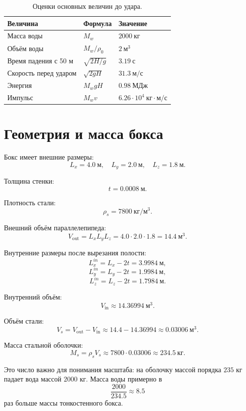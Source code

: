 \documentclass[12pt,a4paper]{article}
\begin{document}
\begin{table}[h]
\centering
\begin{tabular}{lll}
\toprule
Величина & Формула & Значение \\
\midrule
Масса воды & \(M_w\) & \(2000 \ \text{кг}\) \\
Объём воды & \(M_w/\rho_0\) & \(2 \ \text{м}^3\) \\
Время падения с 50 м & \(\sqrt{2H/g}\) & \(3.19 \ \text{с}\) \\
Скорость перед ударом & \(\sqrt{2gH}\) & \(31.3 \ \text{м}/\text{с}\) \\
Энергия & \(M_wgH\) & \(0.98 \ \text{МДж}\) \\
Импульс & \(M_wv\) & \(6.26\cdot 10^4 \ \text{кг}\cdot\text{м}/\text{с}\) \\
\bottomrule
\end{tabular}
\caption{Оценки основных величин до удара.}
\end{table}

\section{Геометрия и масса бокса}

Бокс имеет внешние размеры:
\[
L_x = 4.0 \ \text{м}, \quad
L_y = 2.0 \ \text{м}, \quad
L_z = 1.8 \ \text{м}.
\]

Толщина стенки:
\[
t = 0.0008 \ \text{м}.
\]

Плотность стали:
\[
\rho_s = 7800 \ \text{кг}/\text{м}^3.
\]

Внешний объём параллелепипеда:
\[
V_{\text{out}} = L_xL_yL_z
= 4.0 \cdot 2.0 \cdot 1.8
= 14.4 \ \text{м}^3.
\]

Внутренние размеры после вырезания полости:
\[
L_x^{in}=L_x-2t=3.9984 \ \text{м},
\]
\[
L_y^{in}=L_y-2t=1.9984 \ \text{м},
\]
\[
L_z^{in}=L_z-2t=1.7984 \ \text{м}.
\]

Внутренний объём:
\[
V_{\text{in}} \approx 14.36994 \ \text{м}^3.
\]

Объём стали:
\[
V_s = V_{\text{out}} - V_{\text{in}}
\approx 14.4 - 14.36994
\approx 0.03006 \ \text{м}^3.
\]

Масса стальной оболочки:
\[
M_s = \rho_s V_s
\approx 7800 \cdot 0.03006
\approx 234.5 \ \text{кг}.
\]

Это число важно для понимания масштаба: на оболочку массой порядка
\(235\) кг падает вода массой \(2000\) кг. Масса воды примерно в
\[
\frac{2000}{234.5} \approx 8.5
\]
раз больше массы тонкостенного бокса.
\end{document}
